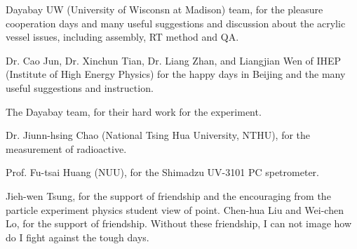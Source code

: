 \begin{acknowledgements}
Dayabay UW (University of Wisconsn at Madison) team, for the pleasure cooperation days
and many useful suggestions and discussion about the acrylic vessel issues, including assembly, RT method and QA.

Dr. Cao Jun, Dr. Xinchun Tian, Dr. Liang Zhan, and Liangjian Wen of IHEP (Institute of High Energy Physics)
for the happy days in Beijing and the many useful suggestions and instruction.

The Dayabay team, for their hard work for the experiment.

Dr. Jiunn-hsing Chao (National Tsing Hua University, NTHU), for the measurement of radioactive.

Prof. Fu-tsai Huang (NUU), for the Shimadzu UV-3101 PC spetrometer.

Jieh-wen Tsung, for the support of friendship and the encouraging from the particle experiment physics student view of point.
Chen-hua Liu and Wei-chen Lo, for the support of friendship. Without these friendship, I can not image how
do I fight against the tough days.








%
%
%
%
%
%
%
%
%
%
%
%
%
%
%
%
\end{acknowledgements}

